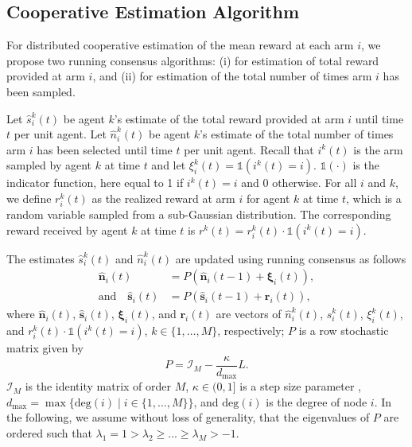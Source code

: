 \documentclass[final,5p,times,twocolumn]{elsarticle}
\theoremstyle{definition}
\newcommand{\until}[1]{\{1,\dots, #1\}}
\newcommand{\setdef}[2]{\{#1 \; | \; #2\}}
\begin{document}
\subsection{Cooperative Estimation Algorithm}
For distributed cooperative estimation of the mean reward at each arm $i$, we propose two running consensus algorithms: (i) for estimation of total reward provided at arm $i$, and (ii) for estimation of the total number of times arm $i$ has been sampled. 

Let $\hat{s}_i^k(t)$  be agent $k$'s estimate of the total reward provided at arm $i$ until time $t$ per unit agent. Let $\hat{n}_i^k(t)$ be agent $k$'s estimate of the total number of times arm $i$ has been selected until time $t$ per unit agent. Recall that $i^k(t)$ is the arm sampled by agent $k$ at time $t$ and let $\xi_i^k(t) = \mathds{1} (i^k(t) =i)$.   $\mathds{1}(\cdot)$ is the indicator function, here equal to 1 if $i^k(t)= i$ and 0 otherwise. 
{For all $i$ and $k$,} we define $r_i^k(t)$ as the realized reward at arm $i$ for agent $k$ at time $t$, which is 
a random variable sampled from a sub-Gaussian distribution. The corresponding reward received by agent $k$ at time $t$ is $r^k(t) = r_i^k(t) \cdot \mathds{1} (i^k(t) =i)$.

The estimates $\hat{s}_i^k(t)$ and $\hat{n}_i^k(t)$ are updated using running consensus as follows
\begin{align} \label{nhatdefn}
\mathbf{\hat{n}}_i(t) &= {P \left( \mathbf{\hat{n}}_i(t-1) + \boldsymbol{\xi}_i(t)\right)}, \\
\text{and} \quad \mathbf{\hat{s}}_i(t) &= {P \left(\mathbf{\hat{s}}_i(t-1) + \mathbf{r}_i(t)\right)}, \label{shatdefn}
\end{align}
where $\mathbf{\hat{ n}}_i(t)$, $\mathbf{\hat{ s}}_i(t)$, $\boldsymbol{\xi}_i(t)$, and $\mathbf{r}_i(t)$ are vectors of $\hat n_i^k(t)$, $\hat s_i^k(t)$, $\xi_i^k(t)$, and $r_i^k(t) \cdot \mathds{1} (i^k(t) =i)$, $k\in \until{M}$, respectively; $P$ is a row stochastic matrix given by
\begin{equation} 
P= \mathcal{I}_M - \frac{\kappa}{d_{\text{max}}} L. \label{Pdefn}
\end{equation}
$\mathcal{I}_M$ is the identity matrix of order $M$, $\kappa \in (0,1]$ is a step size parameter \cite{olfati2004consensus}, $d_{\text{max}} =\max \setdef{\text{deg}(i)}{i \in \until{M}}$, and $\text{deg}(i)$ is the degree of node $i$. In the following, we assume without loss of generality, that the eigenvalues of $P$ are ordered such that $\lambda_1 = 1 > \lambda_2 \geq ... \geq \lambda_M > -1$. 
\end{document}
